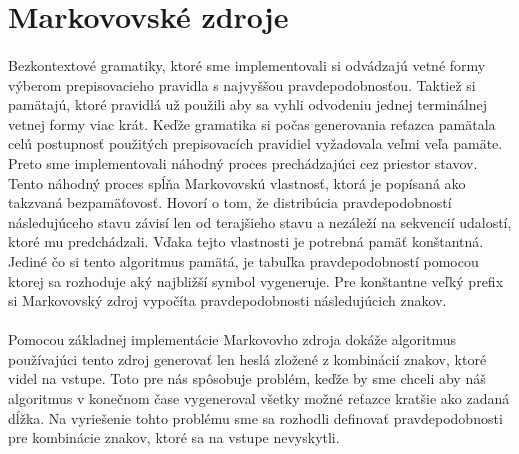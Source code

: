 \section{Markovovské zdroje}
\paragraph{}
Bezkontextové gramatiky, ktoré sme implementovali si odvádzajú vetné formy výberom prepisovacieho pravidla s najvyššou pravdepodobnosťou. Taktiež si pamätajú, ktoré pravidlá už použili aby sa vyhli odvodeniu jednej terminálnej vetnej formy viac krát. Keďže gramatika si počas generovania reťazca pamätala celú postupnosť použitých prepisovacích pravidiel vyžadovala veľmi veľa pamäte. Preto sme implementovali náhodný proces prechádzajúci cez priestor stavov. Tento náhodný proces spĺňa Markovovskú vlastnosť, ktorá je popísaná ako takzvaná bezpamäťovosť. Hovorí o tom, že distribúcia pravdepodobností následujúceho stavu závisí len od terajšieho stavu a nezáleží na sekvencií udalostí, ktoré mu predchádzali. Vďaka tejto vlastnosti je potrebná pamäť konštantná. Jediné čo si tento algoritmus pamätá, je tabuľka pravdepodobností pomocou ktorej sa rozhoduje aký najbližší symbol vygeneruje. Pre konštantne veľký prefix si Markovovský zdroj vypočíta pravdepodobnosti následujúcich znakov.

\paragraph{}
Pomocou základnej implementácie Markovovho zdroja dokáže algoritmus používajúci tento zdroj generovať len heslá zložené z kombinácií znakov, ktoré videl na vstupe. Toto pre nás spôsobuje problém, keďže by sme chceli aby náš algoritmus v konečnom čase vygeneroval všetky možné reťazce kratšie ako zadaná dĺžka. Na vyriešenie tohto problému sme sa rozhodli definovať pravdepodobnosti pre kombinácie znakov, ktoré sa na vstupe nevyskytli.